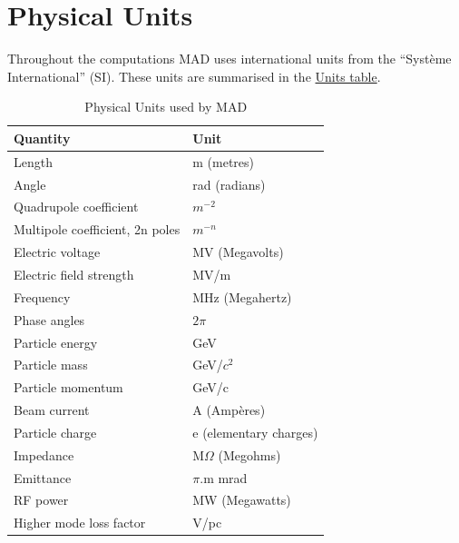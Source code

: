 \section{Physical Units}
\label{sec:units}
Throughout the computations MAD uses international units from the ``Syst\`eme
International'' (SI). These units are summarised in the
\hyperlink{table}{Units table}.  
\begin{table}[h]
  \caption{Physical Units used by MAD}
  \begin{center}
   \begin{tabular}{|l|l|}
      \hline
      Quantity                & Unit \\
      \hline
      Length                  & m (metres) \\ 
      Angle                   & rad (radians) \\ 
      Quadrupole coefficient  & $m^{-2}$ \\ 
      Multipole coefficient, 2n poles   & $m^{-n}$ \\ 
      Electric voltage        & MV (Megavolts) \\ 
      Electric field strength & MV/m \\ 
      Frequency               & MHz (Megahertz) \\ 
      Phase angles            & $2\pi$ \\ 
      Particle energy         & GeV \\ 
      Particle mass           & GeV/$c^2$ \\ 
      Particle momentum       & GeV/c \\ 
      Beam current            & A (Amp\`eres) \\ 
      Particle charge         & e (elementary charges) \\ 
      Impedance               & M$\Omega$ (Megohms) \\ 
      Emittance               & $\pi$.m mrad \\ %
      RF power                & MW (Megawatts) \\ 
      Higher mode loss factor & V/pc \\
      \hline
    \end{tabular}
  \end{center}
\end{table}

